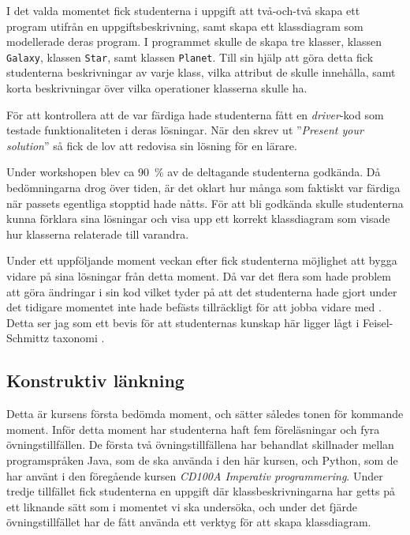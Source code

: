 \documentclass[a4paper, 10pt]{article}
\begin{document}
I det valda momentet fick studenterna i uppgift 
att två-och-två skapa ett program utifrån en 
uppgiftsbeskrivning, samt skapa ett klassdiagram
som modellerade deras program. I programmet 
skulle de skapa tre klasser, klassen 
\texttt{Galaxy}, klassen \texttt{Star},
samt klassen \texttt{Planet}. Till sin hjälp att 
göra detta fick studenterna beskrivningar av 
varje klass, vilka attribut de skulle innehålla, 
samt korta beskrivningar över vilka operationer 
klasserna skulle ha.

För att kontrollera att de var färdiga hade 
studenterna fått en \textit{driver}-kod som 
testade funktionaliteten i deras lösningar. 
När den skrev ut ''\textit{Present your 
solution}'' så fick de lov att redovisa sin 
lösning för en lärare.

Under workshopen blev ca 90~\% av de deltagande
studenterna godkända. Då bedömningarna drog 
över tiden, är det oklart hur många som 
faktiskt var färdiga när passets egentliga 
stopptid hade nåtts. För att bli godkända skulle 
studenterna kunna förklara sina lösningar och 
visa upp ett korrekt klassdiagram som visade 
hur klasserna relaterade till varandra.

Under ett uppföljande moment veckan efter fick 
studenterna möjlighet att bygga vidare på sina 
lösningar från detta moment. Då var det flera 
som hade problem att göra ändringar i sin kod 
vilket tyder på att det studenterna hade gjort 
under det tidigare momentet inte hade befästs 
tillräckligt för att jobba vidare med \parencite[sida 22]{elmgrenolding2025}. 
Detta ser jag som ett bevis för att studenternas 
kunskap här ligger lågt i Feisel-Schmittz 
taxonomi \parencite[sida 159]{elmgrenolding2025}.

\subsection{Konstruktiv länkning}


Detta är kursens första bedömda moment, och 
sätter således tonen för kommande moment. 
Inför detta moment har studenterna haft fem 
föreläsningar och fyra övningstillfällen. 
De första två övningstillfällena har behandlat 
skillnader mellan programspråken Java, som de 
ska använda i den här kursen, och Python, som 
de har använt i den föregående kursen 
\textit{CD100A Imperativ programmering}. 
Under tredje tillfället fick studenterna en 
uppgift där klassbeskrivningarna har getts på 
ett liknande sätt som i momentet vi ska 
undersöka, och under det fjärde 
övningstillfället har de fått använda 
ett verktyg för att skapa klassdiagram.
\end{document}
